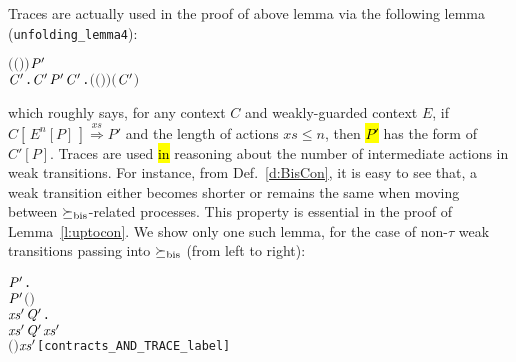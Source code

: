 Traces are actually used in the proof of above lemma via 
the following lemma (\texttt{unfolding_lemma4}):
\begin{alltt}
\HOLTokenTurnstile{}   \HOLSymConst{\HOLTokenConj{}}   \HOLSymConst{\HOLTokenConj{}}  \ensuremath{(}\ensuremath{(} \HOLSymConst{\HOLTokenCompose}   \ensuremath{)} \ensuremath{)}  \ensuremath{\HOLFreeVar{P}\sp{\prime}} \HOLSymConst{\HOLTokenConj{}}   \HOLSymConst{\HOLTokenLeq{}}  \HOLSymConst{\HOLTokenImp{}}
   \HOLSymConst{\HOLTokenExists{}}\ensuremath{\HOLBoundVar{C}\sp{\prime}}.  \ensuremath{\HOLBoundVar{C}\sp{\prime}} \HOLSymConst{\HOLTokenConj{}} \ensuremath{\HOLFreeVar{P}\sp{\prime}} \HOLSymConst{\ensuremath{=}} \ensuremath{\HOLBoundVar{C}\sp{\prime}}  \HOLSymConst{\HOLTokenConj{}} \HOLSymConst{\HOLTokenForall{}}.  \ensuremath{(}\ensuremath{(} \HOLSymConst{\HOLTokenCompose}   \ensuremath{)} \ensuremath{)}  \ensuremath{(}\ensuremath{\HOLBoundVar{C}\sp{\prime}} \ensuremath{)}
\end{alltt}
which roughly says, for any context $C$ and weakly-guarded context
$E$, if $C [\, E^n[P]\,] \overset{xs}{\Longrightarrow} P'$ and the length
of actions $xs \leqslant n$, then \hl{$P'$} has the form of $C'[P]$.
Traces are used \hl{in} reasoning about the number of intermediate actions in weak
transitions. For instance, from Def.~\ref{d:BisCon}, it is easy
to see that, a weak transition either becomes shorter
or remains the same when moving between $\mathrel{\succeq_{\rm{bis}}}$-related processes.
This property is essential in the proof of
Lemma~\ref{l:uptocon}. We show only one such lemma, for the case of
non-$\tau$ weak transitions passing into $\mathrel{\succeq_{\rm{bis}}}$ (from left to right):
\begin{alltt}
\HOLTokenTurnstile{}  \HOLSymConst{\HOLTokenContracts{}}  \HOLSymConst{\HOLTokenImp{}}
   \HOLSymConst{\HOLTokenForall{}}  \ensuremath{\HOLBoundVar{P}\sp{\prime}}.
          \ensuremath{\HOLBoundVar{P}\sp{\prime}} \HOLSymConst{\HOLTokenConj{}}  \ensuremath{(} \ensuremath{)}  \HOLSymConst{\HOLTokenImp{}}
       \HOLSymConst{\HOLTokenExists{}}\ensuremath{\HOLBoundVar{xs}\sp{\prime}} \ensuremath{\HOLBoundVar{Q}\sp{\prime}}.
             \ensuremath{\HOLBoundVar{xs}\sp{\prime}} \ensuremath{\HOLBoundVar{Q}\sp{\prime}} \HOLSymConst{\HOLTokenConj{}}  \HOLSymConst{\HOLTokenContracts{}}  \HOLSymConst{\HOLTokenConj{}}  \ensuremath{\HOLBoundVar{xs}\sp{\prime}} \HOLSymConst{\HOLTokenLeq{}}   \HOLSymConst{\HOLTokenConj{}}
            \ensuremath{(} \ensuremath{)} \ensuremath{\HOLBoundVar{xs}\sp{\prime}}\hfill{[contracts_AND_TRACE_label]}
\end{alltt}

